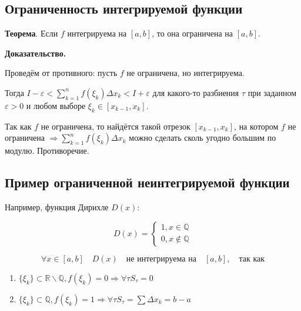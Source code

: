 \documentclass[a4paper]{article}
\begin{document}
\begin{definit}
\hypertarget{p3}{}
\subsection*{Ограниченность интегрируемой функции}

\begin{htheorem}\textbf{Теорема}.
Если $f$ интегрируема на $[a,b]$, то она ограничена на $[a,b]$.

\end{htheorem}

\begin{hproof}\textbf{Доказательство.}

Проведём от противного: пусть $f$ не ограничена, но интегрируема.

Тогда $I - \varepsilon < \sum_{k=1}^n f(\xi_k) \Delta x_k < I + \varepsilon$ для какого-то разбиения $\tau$ при заданном $\varepsilon > 0$ и любом выборе $\xi_k \in [x_{k-1}, x_k]$.

Так как $f$ не ограничена, то найдётся такой отрезок $[x_{k-1}, x_k]$, на котором $f$ не ограничена $\Rightarrow \sum_{k=1}^n f(\xi_k) \Delta x_k $ можно сделать сколь угодно большим по модулю. Противоречие.
\end{hproof}

\end{definit}


\begin{definit}
\hypertarget{p4}{}
\subsection*{Пример ограниченной неинтегрируемой функции}

Например, функция Дирихле $D(x)$:

\[
	D(x) = \begin{cases}
		1, x \in \mathbb{Q} \\
		0, x \notin \mathbb{Q}
	\end{cases}
\]

\[
	\forall x \in [a,b] \quad D(x) \quad \text{не интегрируема на} \quad  [a, b], \quad \text{так как}
\]

\begin{enumerate}
\item $\{ \xi_k \} \subset \mathbb{R} \backslash \mathbb{Q}, f(\xi_k) = 0 \Rightarrow \forall \tau S_\tau = 0$
\item $\{ \xi_k \} \subset \mathbb{Q}, f(\xi_k) = 1 \Rightarrow \forall \tau S_\tau = \sum \Delta x_k = b - a$
\end{enumerate}
\end{definit}
\end{document}
